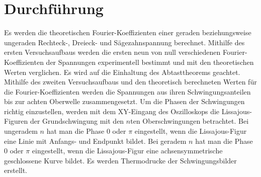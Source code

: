 
\section{Durchführung}
\label{sec:Durchführung}

Es werden die theoretischen Fourier-Koeffizienten einer geraden beziehungsweise ungeraden Rechteck-, Dreieck- und Sägezahnspannung berechnet.
Mithilfe des ersten Versuchsaufbaus werden die ersten neun von null verschiedenen Fourier-Koeffizienten der Spannungen experimentell bestimmt und mit den theoretischen Werten verglichen.
Es wird auf die Einhaltung des Abtasttheorems geachtet.\newline
Mithilfe des zweiten Versuchsaufbaus und den theoretisch berechneten Werten für die Fourier-Koeffizienten werden die Spannungen aus ihren Schwingungsanteilen bis zur achten Oberwelle zusammengesetzt. Um die Phasen der Schwingungen richtig einzustellen, werden mit dem XY-Eingang des Oszilloskops die Lissajous-Figuren der Grundschwingung mit den $n$ten Oberschwingungen betrachtet. Bei ungeradem $n$ hat man die Phase $0$ oder $\pi$ eingestellt, wenn die Lissajous-Figur eine Linie mit Anfangs- und Endpunkt bildet. Bei geradem $n$ hat man die Phase $0$ oder $\pi$ eingestellt, wenn die Lissajous-Figur eine achsensymmetrische geschlossene Kurve bildet.
Es werden Thermodrucke der Schwingungsbilder erstellt. 